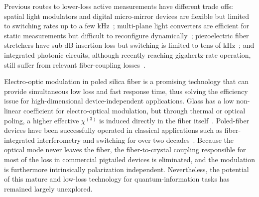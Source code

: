 \documentclass[pra,aps,reprint,nofootinbib,superscriptaddress,floatfix]{revtex4-2}
\begin{document}
Previous routes to lower-loss active measurements have different trade offs: spatial light modulators and digital micro-mirror devices are flexible but limited to switching rates up to a few kHz~\cite{Etcheverry2013,Mirhosseini2015TwistedLight}; multi-plane light converters are efficient for static measurements but difficult to reconfigure dynamically~\cite{Lib2025MPLC}; piezoelectric fiber stretchers have sub-dB insertion loss but switching is limited to tens of kHz~\cite{Nakamura:23}; and integrated photonic circuits, although recently reaching gigahertz-rate operation, still suffer from relevant fiber-coupling losses~\cite{bernardi_gigahertz-rate_2026}. 

Electro-optic modulation in poled silica fiber is a promising technology that can provide simultaneous low loss and fast response time, thus solving the efficiency issue for high-dimensional device-independent applications. Glass has a low non-linear coefficient for electro-optical modulation, but through thermal or optical poling, a higher effective $\chi^{(3)}$ is induced directly in the fiber itself~\cite{Myers1991PoledSilica,Kazansky1997FiberPoling}. Poled-fiber devices have been successfully operated in classical applications such as fiber-integrated interferometry and switching for over two decades~\cite{Fokine2002FiberMZI,SpegelLexne2026Buffer}. Because the optical mode never leaves the fiber, the fiber-to-crystal coupling responsible for most of the loss in commercial pigtailed devices is eliminated, and the modulation is furthermore intrinsically polarization independent. Nevertheless, the potential of this mature and low-loss technology for quantum-information tasks has remained largely unexplored. 
\end{document}
